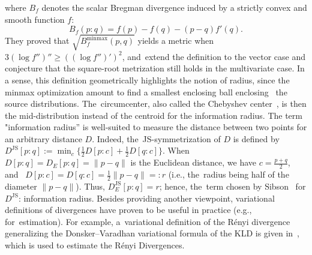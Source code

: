 \documentclass[entropy,article,accept,oneauthor,pdftex,entropy]{Definitions/mdpi}
\def\JS{\mathrm{JS}}
\def\minmax{\mathrm{minmax}}
\begin{document}
\begin{paracol}{2}
\switchcolumn

\noindent where $B_f$ denotes the scalar Bregman divergence induced by a strictly convex and smooth function $f$:
\begin{equation}
B_f(p:q)=f(p)-f(q)-(p-q)f'(q).
\end{equation}
They proved that $\sqrt{B^\minmax_f(p,q)}$ yields a metric when $3(\log f'')''\geq ((\log f'')')^2$, and~extend the definition to the vector case and conjecture that the square-root metrization still holds in the multivariate case. 
In a sense, this definition geometrically highlights the notion of radius, since the minmax optimization amount to find a smallest enclosing ball enclosing~\cite{minmax-2013} the source distributions. The~circumcenter, also called the Chebyshev center~\cite{ChebyshevAlphaDiv-2020}, is then the mid-distribution instead of the centroid for the information radius.
The term "information radius'' is well-suited to measure the distance between two points for an arbitrary distance $D$.
Indeed, the~JS-symmetrization of $D$
 is defined by  $D^\JS[p:q]:=\min_c \{\frac{1}{2}D[p:c]+\frac{1}{2}D[q:c]\}$.
When $D[p:q]=D_E[p:q]=\|p-q\|$ is the Euclidean distance, we have $c=\frac{p+q}{2}$, and~
$D[p:c]=D[q:c]=\frac{1}{2}\|p-q\|=:r$ (i.e., the~radius being half of the diameter $\|p-q\|$). 
Thus, $D^\JS_E[p:q]=r$; hence, the~term chosen by Sibson~\cite{Sibson-1969} for $D^\JS$: information radius.
Besides providing another viewpoint, variational definitions of divergences have proven to be useful in practice (e.g., for~estimation).
For example, a~variational definition of the R\'enyi divergence generalizing the Donsker--Varadhan variational formula of the KLD is given in~\cite{variationalRenyi-2020}, which is used to estimate the R{\'e}nyi Divergences.  


\vspace{6pt} 



\end{paracol}
\end{document}
